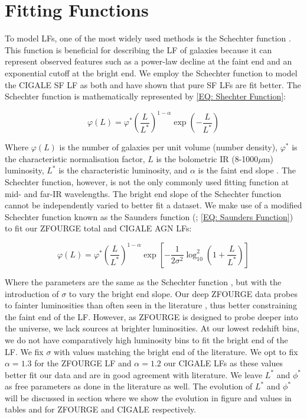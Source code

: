 \section{Fitting Functions}
To model LFs, one of the most widely used methods is the Schechter function \citep{schechter_analytic_1976}. This function is beneficial for describing the LF of galaxies because it can represent observed features such as a power-law decline at the faint end and an exponential cutoff at the bright end. We employ the Schechter function to model the CIGALE SF LF as both \cite{fu_decomposing_2010} and \cite{wu_mid-infrared_2011} have shown that pure SF LFs are fit better. The Schechter function is mathematically represented by \cref{EQ: Shechter Function}:

\begin{equation} 
    \varphi(L) = \varphi^* \left(\frac{L}{L^*}\right)^{1-\alpha} \exp\left(-\frac{L}{L^*}\right) 
    \label{EQ: Shechter Function}
\end{equation}

Where $\varphi(L)$ is the number of galaxies per unit volume (number density), $\varphi^*$ is the characteristic normalisation factor, $L$ is the bolometric IR (8-1000$\mu$m) luminosity, $L^*$ is the characteristic luminosity, and $\alpha$ is the faint end slope \citep{schechter_analytic_1976}. The Schechter function, however, is not the only commonly used fitting function at mid- and far-IR wavelengths. The bright end slope of the Schechter function cannot be independently varied to better fit a dataset. We make use of a modified Schechter function known as the Saunders function (\citealp{saunders_60-mum_1990}; \cref{EQ: Saunders Function}) to fit our ZFOURGE total and CIGALE AGN LFs:

\begin{equation} 
    \varphi(L) = \varphi^* \left(\frac{L}{L^*}\right)^{1-\alpha} \exp\left[-\frac{1}{2\sigma^2}\log_{10}^2\left(1+\frac{L}{L^*}\right)\right]
    \label{EQ: Saunders Function}
\end{equation}

Where the parameters are the same as the Schechter function , but with the introduction of $\sigma$ to vary the bright end slope. Our deep ZFOURGE data probes to fainter luminosities than often seen in the literature \citep{gruppioni_herschel_2013, rodighiero_mid-_2010}, thus better constraining the faint end of the LF. However, as ZFOURGE is designed to probe deeper into the universe, we lack sources at brighter luminosities. At our lowest redshift bins, we do not have comparatively high luminosity bins to fit the bright end of the LF. We fix $\sigma$ with values matching the bright end of the literature. We opt to fix $\alpha=1.3$ for the ZFOURGE LF and $\alpha=1.2$ our CIGALE LFs as these values better fit our data and are in good agreement with literature. We leave $L^{*}$ and $\phi^{*}$ as free parameters as done in the literature as well. The evolution of $L^{*}$ and $\phi^{*}$ will be discussed in section  where we show the evolution in figure and values in tables and  for ZFOURGE and CIGALE respectively.